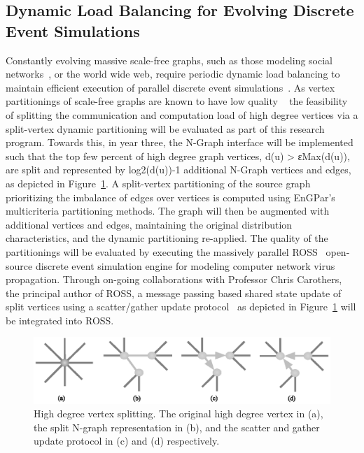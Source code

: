 \documentclass[12pt]{article}
\begin{document}
\subsection{Dynamic Load Balancing for Evolving Discrete Event Simulations} 
Constantly evolving massive scale-free graphs, such as those modeling social
networks~\cite{twitter2010,kwak2010twitter}, or the world wide web, require
periodic dynamic load balancing to maintain efficient execution of parallel
discrete event simulations~\cite{carothers2002ross}.
As vertex partitionings of scale-free graphs are known to have low quality
~\cite{abou2006multilevel,lang2004finding,leskovec2009community,pienta2013parallel} the feasibility of splitting the communication and computation
load of high degree vertices via a split-vertex dynamic partitioning will be
evaluated as part of this research program.
Towards this, in year three, the N-Graph interface will be implemented such
that the top few percent of high degree graph vertices, d(u) > εMax(d(u)), are
split and represented by log2(d(u))-1 additional N-Graph vertices and edges, as
depicted in Figure~\ref{fig:vtxSplitting}.
A split-vertex partitioning of the source graph prioritizing the imbalance of
edges over vertices is computed using EnGPar’s multicriteria partitioning
methods.
The graph will then be augmented with additional vertices and edges,
maintaining the original distribution characteristics, and the dynamic
partitioning re-applied.
The quality of the partitionings will be evaluated by executing the massively
parallel ROSS~\cite{carothers2002ross,mubarak2012modeling,barnes2013warp}
open-source discrete event simulation engine for modeling computer network virus
propagation.
Through on-going collaborations with Professor Chris Carothers, the principal
author of ROSS, a message passing based shared state update of split vertices
using a scatter/gather update
protocol~\cite{gonzalez2012powergraph,sahni2009scalable} as depicted in
Figure~\ref{fig:vtxSplitting} will be integrated into ROSS.

\begin{figure}
  \includegraphics[width=\textwidth]{vtxSplitting.eps}
  \caption{\label{fig:vtxSplitting}
    High degree vertex splitting. 
    The original high degree vertex in (a), the split N-graph representation in
    (b), and the scatter and gather update protocol in (c) and (d) respectively.
  }
\end{figure}



\end{document}
